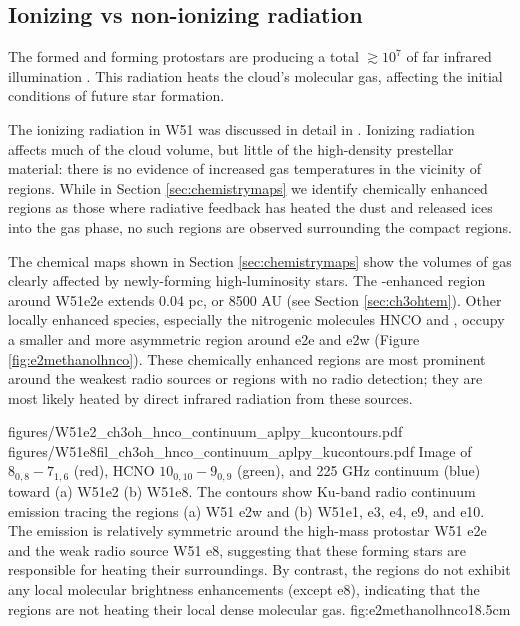 \documentclass{emulateapj}
\begin{document}
\subsection{Ionizing vs non-ionizing radiation}
\label{sec:nonionizingradiation}
The formed and forming protostars are producing a total $\gtrsim10^7$ \lsun of
far infrared illumination \citep{Ginsburg2016b}.  This radiation heats the
cloud's molecular gas, affecting the initial conditions of future star
formation.

The ionizing radiation in W51 was discussed in detail in \citet{Ginsburg2016b}.
Ionizing radiation affects much of the cloud volume, but little of the
high-density prestellar material:  there is no evidence of increased gas
temperatures in the vicinity of \hii regions.  While in Section
\ref{sec:chemistrymaps} we identify chemically enhanced regions as those where
radiative feedback has heated the dust and released ices into the gas phase, no
such regions are observed surrounding the compact \hii regions.


The chemical maps shown in Section \ref{sec:chemistrymaps} show the volumes of
gas clearly affected by newly-forming high-luminosity stars.  The
\methanol-enhanced region around W51e2e extends 0.04 pc, or 8500 AU (see Section
\ref{sec:ch3ohtem}). Other locally enhanced species, especially the nitrogenic
molecules HNCO and \formamide, occupy a smaller and more asymmetric region
around e2e and e2w (Figure \ref{fig:e2methanolhnco}).  These chemically enhanced
regions are most prominent around the weakest radio sources or regions with
no radio detection; they are most likely heated by direct infrared radiation
from these sources.

\FigureTwo
{figures/W51e2_ch3oh_hnco_continuum_aplpy_kucontours.pdf}
{figures/W51e8fil_ch3oh_hnco_continuum_aplpy_kucontours.pdf}
{Image of \methanol $8_{0,8}-7_{1,6}$ (red), HCNO $10_{0,10}-9_{0,9}$ (green), and 225 GHz
continuum (blue) toward (a) W51e2 (b) W51e8.  The contours show Ku-band radio continuum
emission tracing the \hii regions (a) W51 e2w and (b) W51e1, e3, e4, e9, and
e10.  The \methanol emission is relatively symmetric around the high-mass
protostar W51 e2e and the weak radio source W51 e8, suggesting that these
forming stars are responsible for heating their surroundings.  By contrast, the
\hii regions do not exhibit any local molecular brightness enhancements (except
e8), indicating that the \hii regions are not heating their local dense
molecular gas.}
{fig:e2methanolhnco}{1}{8.5cm}
 
\end{document}
